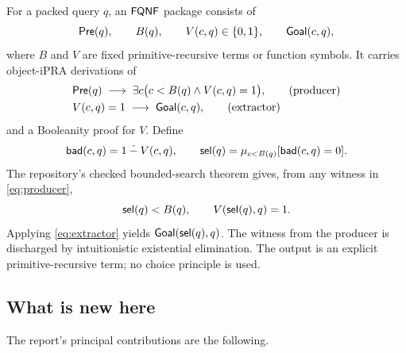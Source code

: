 For a packed query \(q\), an \(\mathsf{FQNF}\) package consists of
\[
  \mathsf{Pre}(q),\qquad B(q),\qquad V(c,q)\in\{0,1\},\qquad
  \mathsf{Goal}(c,q),
\]
where \(B\) and \(V\) are fixed primitive-recursive terms or function symbols.
It carries object-iPRA derivations of
\begin{align}
  &\mathsf{Pre}(q)\;\longrightarrow\;
       \exists c\bigl(c<B(q)\wedge V(c,q)=1\bigr),
       \tag{producer}\label{eq:producer}\\
  &V(c,q)=1\;\longrightarrow\;\mathsf{Goal}(c,q),
       \tag{extractor}\label{eq:extractor}
\end{align}
and a Booleanity proof for \(V\).  Define
\[
  \mathsf{bad}(c,q)=1\mathbin{\dot{-}} V(c,q),
  \qquad
  \mathsf{sel}(q)=\mu_{c<B(q)}[\mathsf{bad}(c,q)=0].
\]
The repository's checked bounded-search theorem gives, from any witness in
\eqref{eq:producer},
\[
 \mathsf{sel}(q)<B(q),\qquad V(\mathsf{sel}(q),q)=1.
\]
Applying \eqref{eq:extractor} yields \(\mathsf{Goal}(\mathsf{sel}(q),q)\).  The witness from the
producer is discharged by intuitionistic existential elimination.  The output
is an explicit primitive-recursive term; no choice principle is used.

\subsection{What is new here}

The report's principal contributions are the following.

